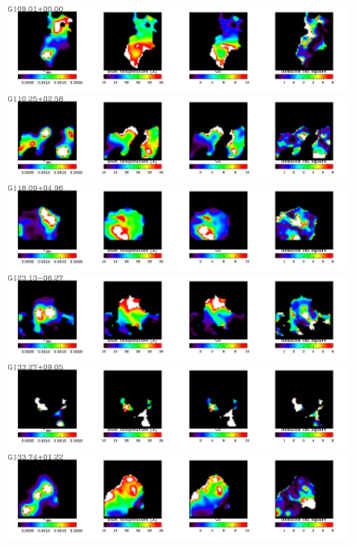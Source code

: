   \begin{figure}
\centering
\includegraphics[trim=0 2mm 0 0, clip, width=190mm]{appA/appA_30.pdf}
\includegraphics[trim=0 2mm 0 0, clip, width=190mm]{appA/appA_31.pdf}
\includegraphics[trim=0 2mm 0 0, clip, width=190mm]{appA/appA_32.pdf}
\includegraphics[trim=0 2mm 0 0, clip, width=190mm]{appA/appA_33.pdf}
\includegraphics[trim=0 2mm 0 0, clip, width=190mm]{appA/appA_34.pdf}
\includegraphics[trim=0 2mm 0 0, clip, width=190mm]{appA/appA_35.pdf}
  \end{figure}
  
